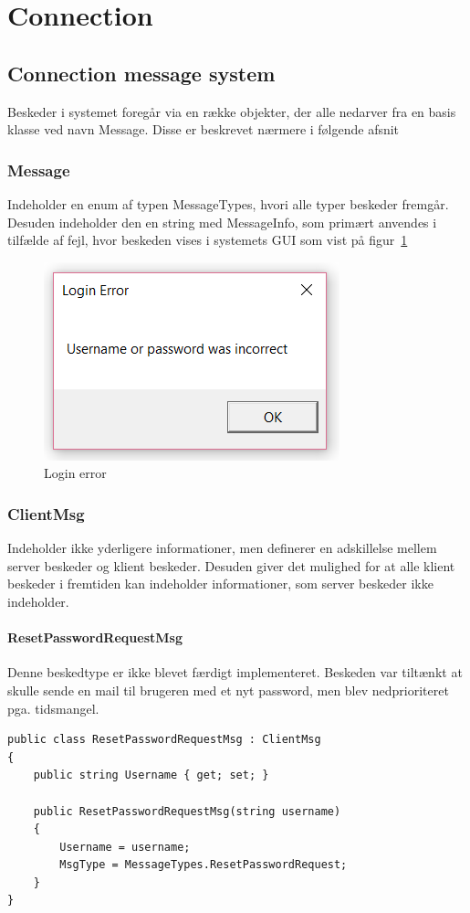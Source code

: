 \section{Connection}

\subsection{Connection message system}

Beskeder i systemet foregår via en række objekter, der alle nedarver fra en basis klasse ved navn Message. Disse er beskrevet nærmere i følgende afsnit

\subsubsection{Message}
Indeholder en enum af typen MessageTypes, hvori alle typer beskeder fremgår. Desuden indeholder den en string med MessageInfo, som primært anvendes i tilfælde af fejl, hvor beskeden vises i systemets GUI som vist på figur~\ref{fig:loginError}

\begin{figure}
	\centering
	\includegraphics[width=0.3\linewidth]{figs/connection/loginError.png}
	\caption{Login error}
	\label{fig:loginError}
\end{figure}

\subsubsection{ClientMsg}
Indeholder ikke yderligere informationer, men definerer en adskillelse mellem server beskeder og klient beskeder. Desuden giver det mulighed for at alle klient beskeder i fremtiden kan indeholder informationer, som server beskeder ikke indeholder. 

\paragraph{ResetPasswordRequestMsg}
Denne beskedtype er ikke blevet færdigt implementeret. Beskeden var tiltænkt at skulle sende en mail til brugeren med et nyt password, men blev nedprioriteret pga. tidsmangel.
\begin{lstlisting}[caption=ResetPasswordRequestMsg, label=code:ResetPasswordRequestMsg]
public class ResetPasswordRequestMsg : ClientMsg
{
	public string Username { get; set; }
	
	public ResetPasswordRequestMsg(string username)
	{
		Username = username;
		MsgType = MessageTypes.ResetPasswordRequest;
	}
}
\end{lstlisting}

